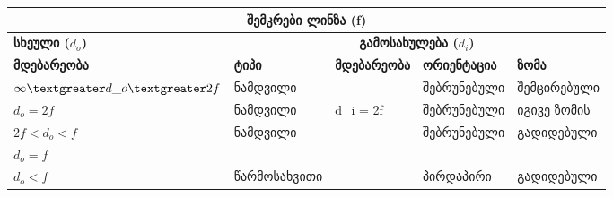 \documentclass{book}
\begin{document}
\begin{table}[]
\begin{tabular}{|lllll|}
\hline
\multicolumn{5}{|c|}{\textbf{შემკრები ლინზა (f)}}                                                                                                                                                                        \\ \hline
\multicolumn{1}{|l|}{\textbf{სხეული ($d_o$)}}                                 & \multicolumn{4}{c|}{\textbf{გამოსახულება ($d_i$)}}                                                                                       \\ \hline
\multicolumn{1}{|l|}{\textbf{მდებარეობა}}                                     & \multicolumn{1}{l|}{\textbf{ტიპი}} & \multicolumn{1}{l|}{\textbf{მდებარეობა}} & \multicolumn{1}{l|}{\textbf{ორიენტაცია}} & \textbf{ზომა} \\ \hline
\multicolumn{1}{|l|}{$\infty \textgreater d\_o \textgreater 2f$} & \multicolumn{1}{l|}{ნამდვილი}      & \multicolumn{1}{l|}{}                    & \multicolumn{1}{l|}{შებრუნებული}         & შემცირებული   \\ \hline
\multicolumn{1}{|l|}{$d_o = 2f$}                                               & \multicolumn{1}{l|}{ნამდვილი}      & \multicolumn{1}{l|}{d\_i = 2f}           & \multicolumn{1}{l|}{შებრუნებული}         & იგივე ზომის   \\ \hline
\multicolumn{1}{|l|}{$2f < d_o < f$}                           & \multicolumn{1}{l|}{ნამდვილი}      & \multicolumn{1}{l|}{}                    & \multicolumn{1}{l|}{შებრუნებული}         & გადიდებული    \\ \hline
\multicolumn{1}{|l|}{$d_o = f$}                                                & \multicolumn{1}{l|}{}              & \multicolumn{1}{l|}{}                    & \multicolumn{1}{l|}{}                    &               \\ \hline
\multicolumn{1}{|l|}{$d_o < f$}                                        & \multicolumn{1}{l|}{წარმოსახვითი}  & \multicolumn{1}{l|}{}                    & \multicolumn{1}{l|}{პირდაპირი}           & გადიდებული    \\ \hline
\end{tabular}
\end{table}
\end{document}
